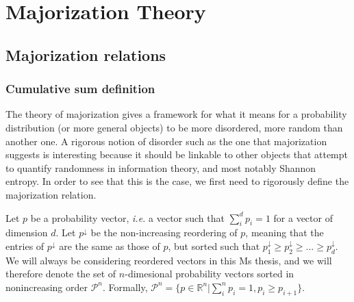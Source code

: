 \chapter{Majorization Theory}



\section{Majorization relations}

\subsection{Cumulative sum definition}

The theory of majorization gives a framework for what it means for a probability distribution (or more general objects) to be more disordered, more random than another one. A rigorous notion of disorder such as the one that majorization suggests is interesting because it should be linkable to other objects that attempt to quantify randomness in information theory, and most notably Shannon entropy. In order to see that this is the case, we first need to rigorously define the majorization relation.

Let $p$ be a probability vector, \textit{i.e.} a vector such that $\sum_{i}^{d} p_i = 1$ for a vector of dimension $d$. Let $p^\downarrow$ be the non-increasing reordering of $p$, meaning that the entries of $p^\downarrow$ are the same as those of $p$, but sorted such that $p^\downarrow_1 \geq p^\downarrow_2 \geq ... \geq p^\downarrow_d$. We will always be considering reordered vectors in this Ms thesis, and we will therefore denote the set of $n$-dimesional probability vectors sorted in nonincreasing order $\mathcal{P}^n$. Formally, $\mathcal{P}^n = \{p \in \mathbb{R}^n | \sum_{i}^{n} p_i = 1, p_i \geq p_{i+1}\}$.

